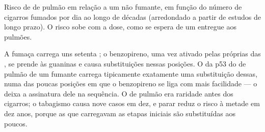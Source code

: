 \begin{omfigure}

{\small Risco de  de pulmão em relação a um não fumante, em
função do número de cigarros fumados por dia ao longo de décadas
(arredondado a partir de estudos de longo prazo). O risco sobe com a
dose, como se espera de um  entregue aos pulmões.}
\end{omfigure}

\begin{example}[O tabaco]\label{ex:g11:cancer:tobacco}
A fumaça carrega uns setenta ; o benzopireno, uma vez
ativado pelas próprias  das , se prende às guaninas e
causa substituições nessas posições. O  da p53 do  de pulmão
de um fumante carrega tipicamente exatamente uma substituição dessas,
numa das poucas posições em que o benzopireno se liga com mais
facilidade --- o  deixa a assinatura dele na sequência. O
 de pulmão era raridade antes dos cigarros; o tabagismo causa
nove casos em dez, e parar reduz o risco à metade em dez anos, porque
as  que carregavam as etapas iniciais são substituídas aos
poucos.
\end{example}

